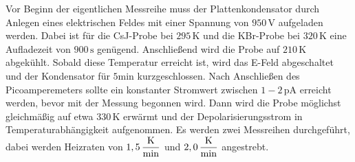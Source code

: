 Vor Beginn der eigentlichen Messreihe muss der Plattenkondensator durch Anlegen eines elektrischen Feldes mit einer Spannung von $950 \,\si{\volt}$ aufgeladen werden.
Dabei ist für die CsJ-Probe bei $295 \,\si{\kelvin}$ und die KBr-Probe bei $320 \,\si{\kelvin}$ eine Aufladezeit von $900 \,\si{\second}$ genügend.
Anschließend wird die Probe auf $210 \,\si{\kelvin}$ abgekühlt.
Sobald diese Temperatur erreicht ist, wird das E-Feld abgeschaltet und der Kondensator für $5 \si{\minute}$ kurzgeschlossen.
Nach Anschließen des Picoamperemeters sollte ein konstanter Stromwert zwischen $1-2 \,\si{\pico\ampere}$ erreicht werden, bevor mit der Messung begonnen wird.
Dann wird die Probe möglichst gleichmäßig auf etwa $330 \,\si{\kelvin}$ erwärmt und der Depolarisierungsstrom in Temperaturabhängigkeit aufgenommen.
Es werden zwei Messreihen durchgeführt, dabei werden Heizraten von $1,5 \, \unit{\dfrac{\kelvin}{\minute}}$ und $2,0 \, \unit{\dfrac{\kelvin}{\minute}}$ angestrebt. 